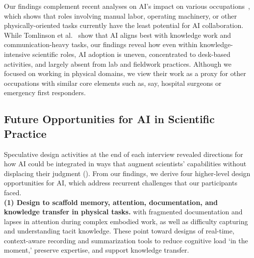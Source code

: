 Our findings complement recent analyses on AI's impact on various occupations~\cite{tomlinson2025working}, which shows that roles involving manual labor, operating machinery, or other physically-oriented tasks currently have the least potential for AI collaboration. While Tomlinson et al.~\cite{tomlinson2025working} show that AI aligns best with knowledge work and communication-heavy tasks, our findings reveal how even within knowledge-intensive scientific roles, AI adoption is uneven, concentrated to desk-based activities, and largely absent from lab and fieldwork practices. Although we focused on  working in physical domains, we view their work as a proxy for other occupations with similar core elements such as, say, hospital surgeons or emergency first responders.


\subsection{Future Opportunities for AI in Scientific Practice}

Speculative design activities at the end of each interview revealed directions for how AI could be integrated in ways that augment scientists' capabilities without displacing their judgment (). From our findings, we derive four higher-level design opportunities for AI, which address recurrent challenges that our participants faced. 
\\

\textbf{(1) Design to scaffold memory, attention, documentation, and knowledge transfer in physical tasks.}  with fragmented documentation and lapses in attention during complex embodied work, as well as difficulty capturing and understanding tacit knowledge. These  point toward designs of real-time, context-aware recording and summarization tools to reduce cognitive load `in the moment,' preserve expertise, and support knowledge transfer. 
\\

